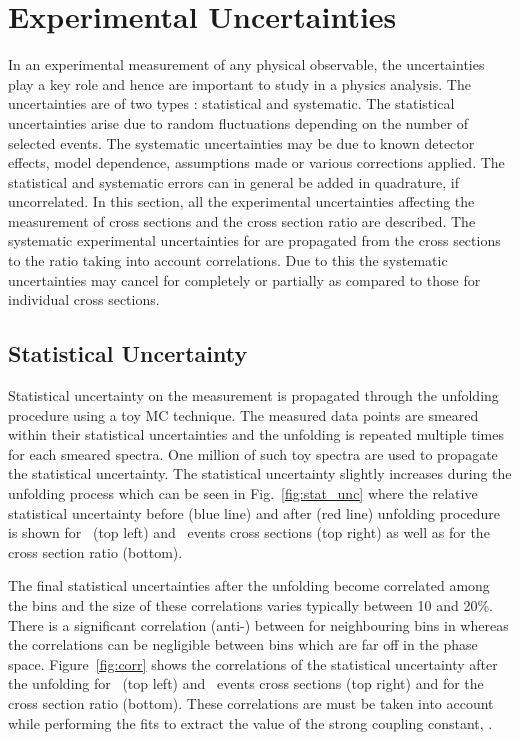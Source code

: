 \section{Experimental Uncertainties}
\label{sec:exp_unc}
In an experimental measurement of any physical observable, the uncertainties play a key role and hence are important to study in a physics analysis. The uncertainties are of two types : statistical and systematic. The statistical uncertainties arise due to random fluctuations depending on the number of selected events. The systematic uncertainties may be due to known detector effects, model dependence, assumptions made or various corrections applied. The statistical and systematic errors can in general be added in quadrature, if uncorrelated. In this section, all the experimental uncertainties affecting the measurement of cross sections and the cross section ratio \ratio are described. The systematic experimental uncertainties for \ratio are propagated from the cross sections to the ratio taking into account correlations. Due to this the systematic uncertainties may cancel for \ratio completely or partially as compared to those for individual cross sections.

\subsection{Statistical Uncertainty}
\label{sec:unfolding_stat}
Statistical uncertainty on the measurement is propagated through the unfolding procedure using a toy MC technique. The measured data points are smeared within their statistical uncertainties and the unfolding is repeated multiple times for each smeared spectra. One million of such toy spectra are used to propagate the statistical uncertainty. The statistical uncertainty slightly increases during the unfolding process which can be seen in Fig.~\ref{fig:stat_unc} where the relative statistical uncertainty before (blue line) and after (red line) unfolding procedure is shown for \njt~(top left) and \njth~events cross sections (top right) as well as for the cross section ratio \ratio (bottom). 

The final statistical uncertainties after the unfolding become correlated among the bins and the size of these correlations varies typically between 10 and 20\%. There is a significant correlation (anti-) between for neighbouring bins in \httwo whereas the correlations can be negligible between bins which are far off in the phase space. Figure~\ref{fig:corr} shows the correlations of the statistical uncertainty after the unfolding for \njt~(top left) and \njth~events cross sections (top right) and for the cross section ratio \ratio (bottom). These correlations are must be taken into account while performing the fits to extract the value of the strong coupling constant, \alpsns. 

